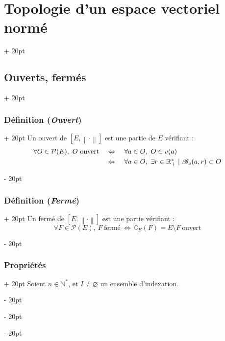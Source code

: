 \documentclass[a4paper, 12pt, twoside]{article}
\newcommand{\N}{\mathbb{N}} %
\newcommand{\R}{\mathbb{R}} %
\newcommand{\norm}[1]{\left\lVert #1 \right\rVert}
\newcommand{\ssi}{\ \Leftrightarrow \ }
\newcommand{\ind}[1][20pt]{\advance\leftskip + #1}
\newcommand{\deind}[1][20pt]{\advance\leftskip - #1}
\newenvironment{indt}[2][20pt]{#2 \par \ind[#1]}{\par \deind} %
\begin{document}
\begin{indt}{\section{Topologie d'un espace vectoriel normé}}
        \begin{indt}{\subsection{Ouverts, fermés}}
            \begin{indt}{\subsubsection{Définition (\textit{Ouvert})}}
                Un ouvert de $[E, \norm \cdot]$ est une partie de $E$ vérifiant :
                \[
                    \begin{array}{rcl}
                        \forall O \in \mathcal P(E),\
                        O\ \text{ouvert}
                        &\ssi&
                        \forall a \in O,\ O \in v(a)
                        \vspace{3pt}
                        \\
                        &\ssi&
                        \forall a \in O,\ \exists r \in \R^*_+\ |\ \mathscr B_o(a, r) \subset O
                    \end{array}
                \]
            \end{indt}

            \vspace{12pt}
            
            \begin{indt}{\subsubsection{Définition (\textit{Fermé})}}
                Un fermé de $[E, \norm \cdot]$ est une partie vérifiant :
                \[
                    \forall F \in \mathcal P(E),\
                    F\ \text{fermé}
                    \ssi
                    \complement_E(F) = E \setminus F\ \text{ouvert}
                \]
            \end{indt}

            \vspace{12pt}
            
            \begin{indt}{\subsubsection{Propriétés}}
                Soient $n \in \N^*$, et $I \neq \varnothing$ un ensemble d'indexation.


\end{indt}
\end{indt}
\end{indt}
\end{document}
